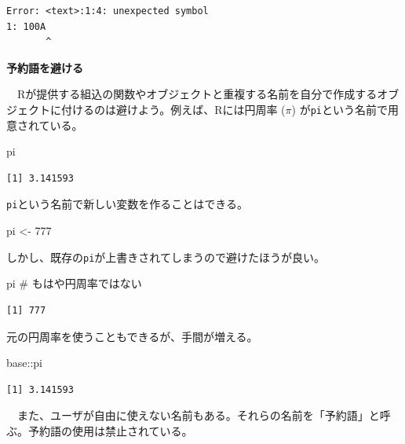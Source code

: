 \documentclass[
  a4paper,
  pandoc,
  ja=standard,
  jafont=haranoaji]{bxjsbook}
\newenvironment{Shaded}{\begin{snugshade}}{\end{snugshade}}
\newcommand{\CommentTok}[1]{\textcolor[rgb]{0.37,0.37,0.37}{#1}}
\newcommand{\DecValTok}[1]{\textcolor[rgb]{0.68,0.00,0.00}{#1}}
\newcommand{\NormalTok}[1]{\textcolor[rgb]{0.00,0.48,0.65}{#1}}
\newcommand{\OtherTok}[1]{\textcolor[rgb]{0.00,0.48,0.65}{#1}}
\newcommand{\SpecialCharTok}[1]{\textcolor[rgb]{0.37,0.37,0.37}{#1}}
\begin{document}
\begin{verbatim}
Error: <text>:1:4: unexpected symbol
1: 100A
       ^
\end{verbatim}

\textbf{予約語を避ける}

　Rが提供する組込の関数やオブジェクトと重複する名前を自分で作成するオブジェクトに付けるのは避けよう。例えば、Rには円周率
(\(\pi\)) が\texttt{pi}という名前で用意されている。

\begin{Shaded}
\begin{Highlighting}[numbers=left,,]
\NormalTok{pi}
\end{Highlighting}
\end{Shaded}

\begin{verbatim}
[1] 3.141593
\end{verbatim}

\texttt{pi}という名前で新しい変数を作ることはできる。

\begin{Shaded}
\begin{Highlighting}[numbers=left,,]
\NormalTok{pi  }\OtherTok{\textless{}{-}} \DecValTok{777}
\end{Highlighting}
\end{Shaded}

しかし、既存の\texttt{pi}が上書きされてしまうので避けたほうが良い。

\begin{Shaded}
\begin{Highlighting}[numbers=left,,]
\NormalTok{pi   }\CommentTok{\# もはや円周率ではない}
\end{Highlighting}
\end{Shaded}

\begin{verbatim}
[1] 777
\end{verbatim}

元の円周率を使うこともできるが、手間が増える。

\begin{Shaded}
\begin{Highlighting}[numbers=left,,]
\NormalTok{base}\SpecialCharTok{::}\NormalTok{pi}
\end{Highlighting}
\end{Shaded}

\begin{verbatim}
[1] 3.141593
\end{verbatim}

　また、ユーザが自由に使えない名前もある。それらの名前を「予約語」と呼ぶ。予約語の使用は禁止されている。
\end{document}
